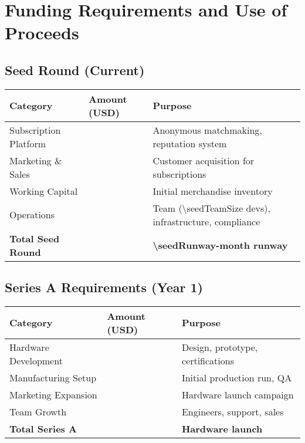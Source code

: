 
\section{Funding Requirements and Use of Proceeds}

\subsection{Seed Round (Current)}
\begin{table}[H]
\centering
\begin{tabularx}{\linewidth}{l Y Y}
\toprule
Category & Amount (USD) & Purpose \\\midrule
Subscription Platform & \numint{\seedUseSubPlatform} & Anonymous matchmaking, reputation system \\
Marketing \& Sales & \numint{\seedUseMarketing} & Customer acquisition for subscriptions \\
Working Capital & \numint{\seedUseWorkingCap} & Initial merchandise inventory \\
Operations & \numint{\seedUseOperations} & Team (\num{\seedTeamSize} devs), infrastructure, compliance \\
\textbf{Total Seed Round} & \textbf{\numint{\seedAmount}} & \textbf{\num{\seedRunway}-month runway} \\
\bottomrule
\end{tabularx}
\end{table}

\subsection{Series A Requirements (Year 1)}
\begin{table}[H]
\centering
\begin{tabularx}{\linewidth}{l Y Y}
\toprule
Category & Amount (USD) & Purpose \\\midrule
Hardware Development\cite{ycombinator2022} & \numint{\seriesAUseHwDev} & Design, prototype, certifications \\
Manufacturing Setup & \numint{\seriesAUseMfg} & Initial production run, QA \\
Marketing Expansion & \numint{\seriesAUseMarketing} & Hardware launch campaign \\
Team Growth & \numint{\seriesAUseTeam} & Engineers, support, sales \\
\textbf{Total Series A} & \textbf{\numint{\seriesAAmount}} & \textbf{Hardware launch} \\
\bottomrule
\end{tabularx}
\end{table}

